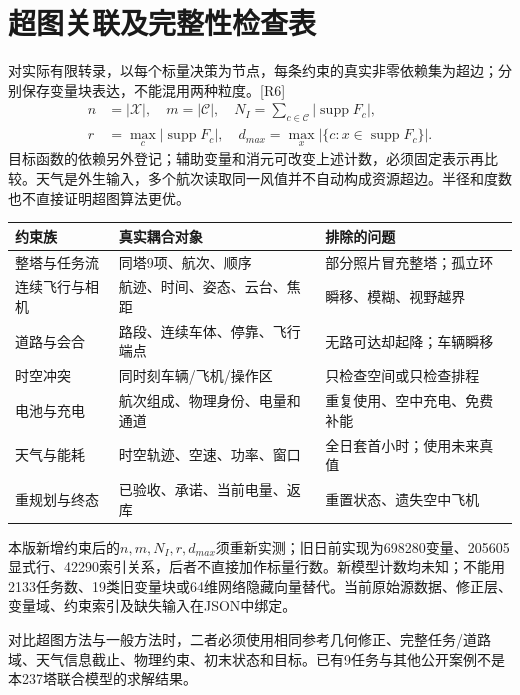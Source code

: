 \section{超图关联及完整性检查表}
\noindent 对实际有限转录，以每个标量决策为节点，每条约束的真实非零依赖集为超边；分别保存变量块表达，不能混用两种粒度。[R6]
\begin{align}
 n&=|\mathcal X|,\quad m=|\mathcal C|,\quad
 N_I=\sum_{c\in\mathcal C}|\operatorname{supp}F_c|,\\
 r&=\max_c|\operatorname{supp}F_c|,\quad
 d_{max}=\max_x|\{c:x\in\operatorname{supp}F_c\}|.
 \label{eng:eq:hypergraph}
\end{align}
\noindent 目标函数的依赖另外登记；辅助变量和消元可改变上述计数，必须固定表示再比较。天气是外生输入，多个航次读取同一风值并不自动构成资源超边。半径和度数也不直接证明超图算法更优。
\begin{center}\small
\begin{tabular}{p{.24\linewidth}p{.42\linewidth}p{.24\linewidth}}\toprule
约束族 & 真实耦合对象 & 排除的问题\\\midrule
整塔与任务流 & 同塔9项、航次、顺序 & 部分照片冒充整塔；孤立环\\
连续飞行与相机 & 航迹、时间、姿态、云台、焦距 & 瞬移、模糊、视野越界\\
道路与会合 & 路段、连续车体、停靠、飞行端点 & 无路可达却起降；车辆瞬移\\
时空冲突 & 同时刻车辆/飞机/操作区 & 只检查空间或只检查排程\\
电池与充电 & 航次组成、物理身份、电量和通道 & 重复使用、空中充电、免费补能\\
天气与能耗 & 时空轨迹、空速、功率、窗口 & 全日套首小时；使用未来真值\\
重规划与终态 & 已验收、承诺、当前电量、返库 & 重置状态、遗失空中飞机\\\bottomrule
\end{tabular}\end{center}
\noindent 本版新增约束后的$n,m,N_I,r,d_{max}$须重新实测；旧日前实现为698280变量、205605显式行、42290索引关系，后者不直接加作标量行数。新模型计数均未知；不能用2133任务数、19类旧变量块或64维网络隐藏向量替代。当前原始源数据、修正层、变量域、约束索引及缺失输入在JSON中绑定。

\noindent 对比超图方法与一般方法时，二者必须使用相同参考几何修正、完整任务/道路域、天气信息截止、物理约束、初末状态和目标。已有9任务与其他公开案例不是本237塔联合模型的求解结果。
\clearpage

